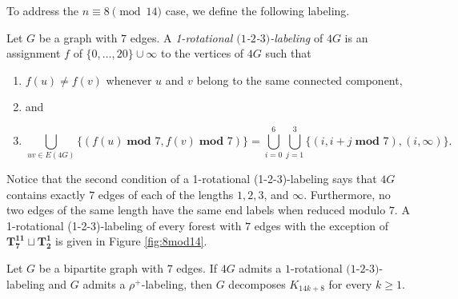 \documentclass{dmgt}
\begin{document}
To address the $n \equiv 8 \pmod{14}$ case, we define the following labeling.
\begin{dnt}\label{def:1-2-3-1-rot}
    Let $G$ be a graph with $7$ edges. A \emph{1-rotational $(1$-$2$-$3)$-labeling} of $4G$ is an assignment $f$ of $\{0,\dots,20\} \cup \infty$ to the vertices of $4G$ such that
    \begin{enumerate}
        \item $f(u) \neq f(v)$ whenever $u$ and $v$ belong to the same connected component, 
        \item[] and
        \item  $$ \bigcup_{uv\in E(4G)} \{(f(u)\; \textbf{mod } 7,f(v)\; \textbf{mod } 7)\}= \bigcup_{i=0}^{6} \bigcup_{j=1}^{3} \{(i,i+j \; \textbf{mod } 7), (i,\infty)\}.$$
    \end{enumerate}
\end{dnt}
Notice that the second condition of a 1-rotational (1-2-3)-labeling says that $4G$ contains exactly $7$ edges of each of the lengths $1,2,3$, and $\infty$. Furthermore, no two edges of the same length have the same end labels when reduced modulo $7.$ A 1-rotational (1-2-3)-labeling of every forest with $7$ edges with the exception of $\mathbf{T_{7}^{11}}\sqcup\mathbf{T_{2}^{1}}$ is given in Figure \ref{fig:8mod14}. 

\begin{theorem}\label{thm:1-2-3 1-rot plus rho}
    Let $G$ be a bipartite graph with $7$ edges. If $4G$ admits a $1$-rotational  $(1$-$2$-$3)$-labeling and $G$ admits a $\rho^{+}$-labeling, then $G$ decomposes $K_{14k+8}$ for every $k\geq1.$
\end{theorem}
\end{document}
